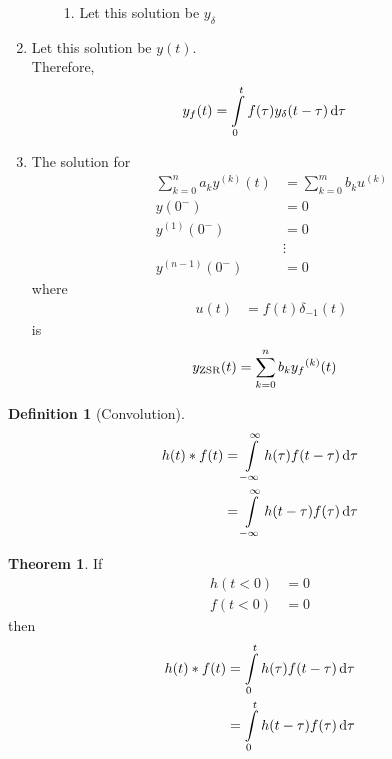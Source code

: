\documentclass[fleqn, a4paper, 12pt, twoside]{article}
\theoremstyle{definition}
\newtheorem{definition}{Definition}
\theoremstyle{theorem}
\newtheorem{theorem}{Theorem}
\begin{document}
\begin{enumerate}
\begin{enumerate}
\begin{enumerate}
					\item
						Let this solution be $y_{\delta}$
				\end{enumerate}
		\end{enumerate}
	\item
		Let this solution be $y(t)$.\\
		Therefore,
		\begin{align*}
			y_f(t) &= \int\limits_{0}^{t} f(\tau) y_{\delta}(t - \tau) \dif \tau
		\end{align*}
	\item
		The solution for
		\begin{align*}
			\sum\limits_{k = 0}^{n} a_k y^{(k)}(t) & = \sum\limits_{k = 0}^{m} b_k u^{(k)} \\
			y(0^-)                                 & = 0                                   \\
			y^{(1)}(0^-)                           & = 0                                   \\
                                                               & \vdots                                \\
			y^{(n - 1)}(0^-)                       & = 0
		\end{align*}
		where
		\begin{align*}
			u(t) & = f(t) \delta_{-1}(t)
		\end{align*}
		is
		\begin{align*}
			y_{\textnormal{ZSR}}(t) & = \sum\limits_{k = 0}^{n} b_k {y_f}^{(k)}(t)
		\end{align*}
\end{enumerate}

\begin{definition}[Convolution]
	\begin{align*}
		h(t) \ast f(t) & = \int\limits_{-\infty}^{\infty} h(\tau) f(t - \tau) \dif \tau \\
                               & = \int\limits_{-\infty}^{\infty} h(t - \tau) f(\tau) \dif \tau
	\end{align*}
\end{definition}

\begin{theorem}
	If
	\begin{align*}
		h(t < 0) & = 0 \\
		f(t < 0) & = 0
	\end{align*}
	then
	\begin{align*}
		h(t) \ast f(t) & = \int\limits_{0}^{t} h(\tau) f(t - \tau) \dif \tau \\
                               & = \int\limits_{0}^{t} h(t - \tau) f(\tau) \dif \tau
	\end{align*}
\end{theorem}
\end{document}
